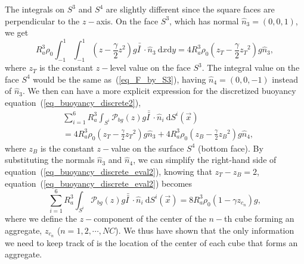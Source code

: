 \par
The integrals on $S^3$ and $S^4$ are slightly different since the square faces are perpendicular to the $z-$axis. On the face $S^3$, which has normal $\hat{n}_3 = (0,0,1)$, we get
\begin{equation}
	R_a^3
\rho_0\int_{-1}^{1} \int_{-1}^{1}
  	\left( 
  	 z - \frac{\gamma}{2}{z}^2 
 	\right)g  \bar{\bar{I \ }}  \cdot
 	\hat{n}_3 \ 
	\textrm{d}x  \textrm{d}y 
	= 4 R_a^3 \rho_0 \left( z_T - \frac{\gamma}{2} {z_T}^{2} \right) g \hat{n}_3,
	\label{eq_F_by_S3}
\end{equation} 
where $z_T$ is the constant $z-$level value on the face $S^3$. The integral value on the face $S^4$ would be the same as~(\ref{eq_F_by_S3}), having $\hat{n}_4 = (0,0,-1)$ instead of $\hat{n}_3$. We then can have a more explicit expression for the discretized buoyancy equation~(\ref{eq_buoyancy_discrete2}),
\begin{align}
	& \sum_{i=1}^{6} R_a^3
	 \int_{S^i}
	 \mathcal{P}_{bg}(z) 
	  g \bar{\bar{I \ }}  \cdot
	\hat{n}_i \ \textrm{d}S^i (\vec{x})
	\nonumber 
	\\
	& = 4 R_a^3 \rho_0 \left( z_T - \frac{\gamma}{2} {z_T}^{2}  \right) g \hat{n}_3
	+ 4R_a^3 \rho_0 \left( z_B - \frac{\gamma}{2} {z_B}^{2}  \right) g \hat{n}_4,
\label{eq_buoyancy_discrete_eval2}
\end{align}
where $z_B$ is the constant $z-$value on the surface $S^4$ (bottom face). By substituting the normals $\hat{n}_3$ and $\hat{n}_4$, we can simplify the right-hand side of equation~(\ref{eq_buoyancy_discrete_eval2}), knowing that $z_T - z_B = 2$, equation~(\ref{eq_buoyancy_discrete_eval2}) becomes 
\begin{equation}
	\sum_{i=1}^{6} R_a^3
	\int_{S^i} 
	\mathcal{P}_{bg}(z) 
	g \bar{\bar{I \ }}  \cdot
   \hat{n}_i \ \textrm{d}S^i (\vec{x})
= 8 R_a^3 \rho_0 \left( 1 - \gamma z_{c_n} \right) g, 
\label{eq_buoyancy_z_eval2}
\end{equation}
where we define the $z-$component of the center of the $n-$th cube forming an aggregate, $z_{c_n}$ ($ n = 1, 2, \cdots, NC$).
We thus have shown that the only information we need to keep track of is the location of the center of each cube that forms an aggregate.
%

